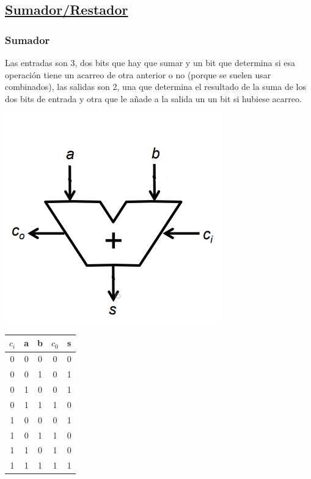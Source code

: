 \documentclass[a4paper,10pt]{book}
\begin{document}
\subsection*{\underline{Sumador/Restador}}
\subsubsection*{Sumador}
Las entradas son 3, dos bits que hay que sumar y un bit que determina si esa operación tiene un acarreo de otra anterior o no (porque se suelen usar combinados), las salidas son 2, una que determina el resultado de la suma de los dos bits de entrada y otra que le añade a la salida un un bit si hubiese acarreo.

\begin{multicols}{2}
	
\begin{center}
\includegraphics[scale=0.45]{sumador simple}
\end{center}

\begin{center}
\begin{tabular}{|c|c|c|c|c|}
\hline
$c_i$ & a & b & $c_0$ & s \\
\hline
0 & 0 & 0 & 0 & 0 \\
\hline
0 & 0 & 1 & 0 & 1 \\
\hline
0 & 1 & 0 & 0 & 1 \\
\hline
0 & 1 & 1 & 1 & 0 \\
\hline
1 & 0 & 0 & 0 & 1 \\
\hline
1 & 0 & 1 & 1 & 0 \\
\hline
1 & 1 & 0 & 1 & 0 \\
\hline
1 & 1 & 1 & 1 & 1 \\
\hline
\end{tabular}
\end{center}

\end{multicols}
\end{document}
